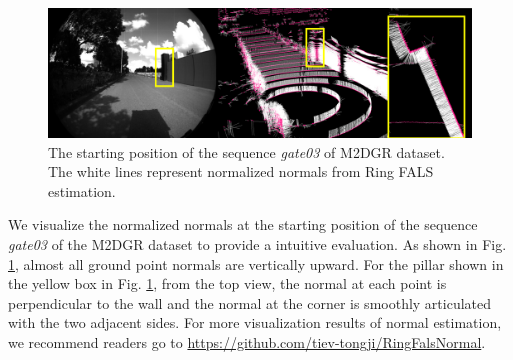 \documentclass[letterpaper, 10 pt, conference]{ieeeconf}  %
\begin{document}
\begin{figure}[!ht]
        \centering
        \includegraphics[width=17cm]{fig/normals.jpg}
        \caption{The starting position of the sequence \emph{gate03} of M2DGR dataset.
                The white lines represent normalized normals from Ring FALS estimation.}
        \label{fig_normal}
\end{figure}
We visualize the normalized normals at the starting position of the sequence \emph{gate03} of the M2DGR dataset to provide a intuitive evaluation.
As shown in Fig. \ref{fig_normal}, almost all ground point normals are vertically upward.
For the pillar shown in the yellow box in Fig. \ref{fig_normal}, from the top view, the normal at each point is perpendicular to the wall and the normal at the corner is smoothly articulated with the two adjacent sides.
For more visualization results of normal estimation, we recommend readers go to \href{https://github.com/tiev-tongji/RingFalsNormal}{https://github.com/tiev-tongji/RingFalsNormal}.
\end{document}

